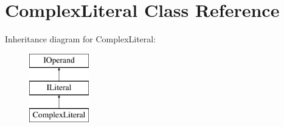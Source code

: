\hypertarget{class_complex_literal}{}\section{Complex\+Literal Class Reference}
\label{class_complex_literal}
Inheritance diagram for Complex\+Literal\+:\begin{figure}[H]
\begin{center}
\leavevmode
\includegraphics[height=3.000000cm]{class_complex_literal}
\end{center}
\end{figure}
